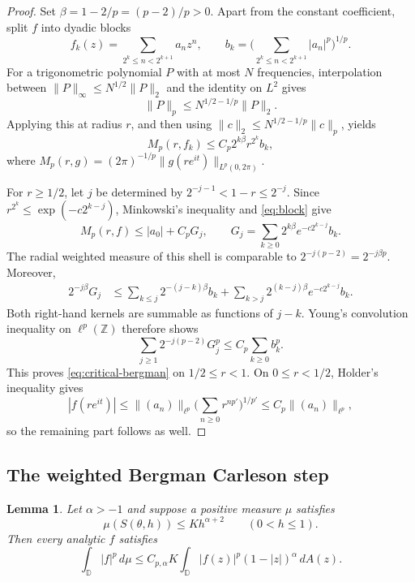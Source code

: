 \documentclass[11pt]{article}
\newtheorem{lemma}[theorem]{Lemma}
\newcommand{\D}{\mathbb D}
\newcommand{\dd}{\,d}
\begin{document}
\begin{proof}
Set $\beta=1-2/p=(p-2)/p>0$.  Apart from the constant coefficient, split
$f$ into dyadic blocks
\[
 f_k(z)=\sum_{2^k\leq n<2^{k+1}}a_nz^n,
 \qquad b_k=\Big(\sum_{2^k\leq n<2^{k+1}}|a_n|^p\Big)^{1/p}.
\]
For a trigonometric polynomial $P$ with at most $N$ frequencies,
interpolation between
$\|P\|_\infty\leq N^{1/2}\|P\|_2$ and the identity on $L^2$ gives
\[
 \|P\|_p\leq N^{1/2-1/p}\|P\|_2.
\]
Applying this at radius $r$, and then using
$\|c\|_2\leq N^{1/2-1/p}\|c\|_p$, yields
\begin{equation}\label{eq:block}
 M_p(r,f_k)
 \leq C_p2^{k\beta}r^{2^k}b_k,
\end{equation}
where
$M_p(r,g)=(2\pi)^{-1/p}\|g(re^{it})\|_{L^p(0,2\pi)}$.

For $r\geq1/2$, let $j$ be determined by
$2^{-j-1}<1-r\leq2^{-j}$.  Since
$r^{2^k}\leq\exp(-c2^{k-j})$, Minkowski's inequality and
\eqref{eq:block} give
\[
 M_p(r,f)\leq |a_0|+C_pG_j,
 \qquad
 G_j=\sum_{k\geq0}2^{k\beta}e^{-c2^{k-j}}b_k.
\]
The radial weighted measure of this shell is comparable to
$2^{-j(p-2)}=2^{-j\beta p}$.  Moreover,
\begin{align*}
 2^{-j\beta}G_j
 &\leq
 \sum_{k\leq j}2^{-(j-k)\beta}b_k
 +\sum_{k>j}2^{(k-j)\beta}e^{-c2^{k-j}}b_k.
\end{align*}
Both right-hand kernels are summable as functions of $j-k$.  Young's
convolution inequality on $\ell^p(\mathbb Z)$ therefore shows
\[
 \sum_{j\geq1}2^{-j(p-2)}G_j^p
 \leq C_p\sum_{k\geq0}b_k^p.
\]
This proves \eqref{eq:critical-bergman} on $1/2\leq r<1$.  On
$0\leq r<1/2$, Holder's inequality gives
\[
 |f(re^{it})|
 \leq \|(a_n)\|_{\ell^p}
 \Big(\sum_{n\geq0}r^{np'}\Big)^{1/p'}
 \leq C_p\|(a_n)\|_{\ell^p},
\]
so the remaining part follows as well.
\end{proof}

\subsection*{The weighted Bergman Carleson step}

\begin{lemma}\label{lem:carleson}
Let $\alpha>-1$ and suppose a positive measure $\mu$ satisfies
\[
 \mu(S(\theta,h))\leq Kh^{\alpha+2}
 \qquad(0<h\leq1).
\]
Then every analytic $f$ satisfies
\begin{equation}\label{eq:bergman-carleson}
 \int_{\D}|f|^p\dd\mu
 \leq C_{p,\alpha}K
 \int_{\D}|f(z)|^p(1-|z|)^\alpha\dd A(z).
\end{equation}
\end{lemma}
\end{document}
